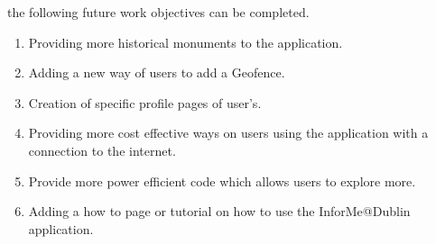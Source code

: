 the following future work objectives can be completed.
\begin{enumerate}
    \item Providing more historical monuments to the application.
    \item Adding a new way of users to add a Geofence.
    \item Creation of specific profile pages of user's.
    \item Providing more cost effective ways on users using the application with a connection to the internet.
    \item Provide more power efficient code which allows users to explore more.
    \item Adding a how to page or tutorial on how to use the InforMe@Dublin application.
\end{enumerate}
